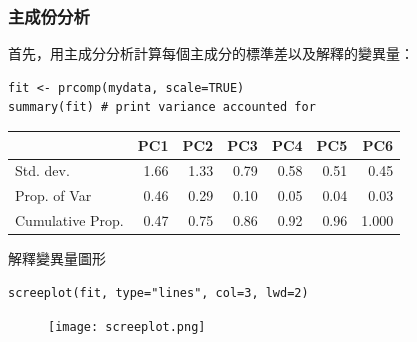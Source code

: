 \documentclass[xcolor=dvipsnames, 13pt]{beamer}
\begin{document}
\begin{frame}[fragile]\frametitle{主成份分析}
首先，用主成分分析計算每個主成分的標準差以及解釋的變異量：
\bigskip
\begin{Verbatim}[frame=single,label=\textit{R code}]
fit <- prcomp(mydata, scale=TRUE)
summary(fit) # print variance accounted for 
\end{Verbatim}
\begin{table}
\begin{tabular}{| l | r | r | r | r | r | r |}
\hline
         &         PC1  &  PC2  &  PC3 &    PC4  &   PC5 & PC6 \\
\hline
Std. dev.  &     1.66 &  1.33 &  0.79 & 0.58 & 0.51 & 0.45 \\
Prop. of Var & 0.46 & 0.29 & 0.10 & 0.05 & 0.04 & 0.03 \\
Cumulative Prop.  &  0.47 & 0.75 & 0.86 & 0.92 & 0.96 & 1.000\\
\hline
\end{tabular}
\end{table}
\end{frame}
\begin{frame}[fragile=singleslide]{解釋變異量圖形}

\begin{Verbatim}[frame=single,label=\textit{R code}]
screeplot(fit, type="lines", col=3, lwd=2) 
\end{Verbatim}

\begin{figure}
\begin{center}
\texttt{[image: screeplot.png]}
\end{center}
\end{figure}
\end{frame}
\end{document}

